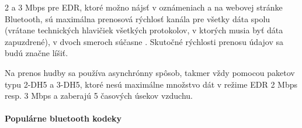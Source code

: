 \documentclass[10pt,twoside,slovak,a4paper]{article}
\begin{document}
2 a 3 Mbps pre EDR, ktoré možno nájsť v oznámeniach a na webovej stránke Bluetooth, sú maximálna prenosová rýchlosť kanála pre všetky dáta spolu (vrátane technických hlavičiek všetkých protokolov, v ktorých musia byť dáta zapuzdrené), v dvoch smeroch súčasne . Skutočné rýchlosti prenosu údajov sa budú značne líšiť.\cite{ValdikSS}

Na prenos hudby sa používa asynchrónny spôsob, takmer vždy pomocou paketov typu 2-DH5 a 3-DH5, ktoré nesú maximálne množstvo dát v režime EDR 2 Mbps resp. 3 Mbps a zaberajú 5 časových úsekov vzduchu.\cite{ValdikSS}

\paragraph{Populárne bluetooth kodeky}  \label{Bluetooth kodeky}  
\end{document}
